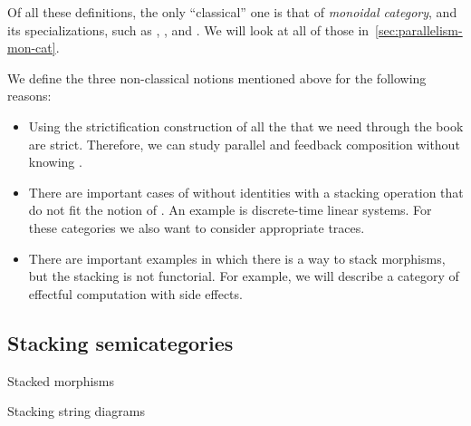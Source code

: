 \begin{remark}
    Of all these definitions, the only ``classical'' one is that of \emph{monoidal category}, and its specializations, such as , , and .
    We will look at all of those in~\cref{sec:parallelism-mon-cat}.

    We define the three non-classical notions mentioned above for the following reasons:
    \begin{itemize}
        \item Using the strictification construction of \SetL all the  that we need through the book are strict.
              Therefore, we can study parallel and feedback composition without knowing .

        \item There are important cases of  without identities with a stacking operation that do not fit the notion of .
              An example is discrete-time linear systems.
              For these categories we also want to consider appropriate traces.
        \item There are important examples in which there is a way to stack morphisms, but the stacking is not functorial.
              For example, we will describe a category of effectful computation with side effects.
    \end{itemize}
\end{remark}

\subsection{Stacking semicategories}

\begin{marginfigure}
    \centering
    \caption{Stacked morphisms}
    \label{fig:stacked-morphisms}
\end{marginfigure}

\begin{marginfigure}
    \centering
    \caption{Stacking string diagrams}
    \label{fig:stacked-morphisms-diagram}
\end{marginfigure}

